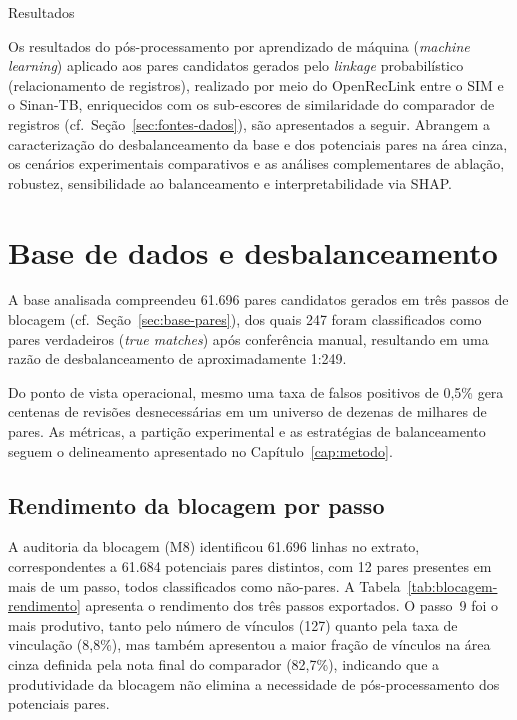 \begin{chapter}{Resultados}
\label{cap:resultados}

Os resultados do pós-processamento por aprendizado de máquina (\textit{machine learning}) aplicado aos pares candidatos gerados pelo \textit{linkage} probabilístico (relacionamento de registros), realizado por meio do OpenRecLink \cite{Camargo2000reclink} entre o SIM e o Sinan-TB, enriquecidos com os sub-escores de similaridade do comparador de registros \cite{Lucena2013algoritmos, Jardim2024comparador} (cf.\ Seção~\ref{sec:fontes-dados}), são apresentados a seguir. Abrangem a caracterização do desbalanceamento da base e dos potenciais pares na área cinza, os cenários experimentais comparativos e as análises complementares de ablação, robustez, sensibilidade ao balanceamento e interpretabilidade via SHAP.

\section{Base de dados e desbalanceamento}
\label{sec:cap5-dados-desbalanceamento}

A base analisada compreendeu 61.696 pares candidatos gerados em três passos de blocagem (cf.\ Seção~\ref{sec:base-pares}), dos quais 247 foram classificados como pares verdadeiros (\textit{true matches}) após conferência manual, resultando em uma razão de desbalanceamento de aproximadamente 1:249.

Do ponto de vista operacional, mesmo uma taxa de falsos positivos de 0,5\% gera centenas de revisões desnecessárias em um universo de dezenas de milhares de pares. As métricas, a partição experimental e as estratégias de balanceamento seguem o delineamento apresentado no Capítulo~\ref{cap:metodo}.

\subsection{Rendimento da blocagem por passo}
\label{sec:blocagem-rendimento}

A auditoria da blocagem (M8) identificou 61.696 linhas no extrato, correspondentes a 61.684 potenciais pares distintos, com 12 pares presentes em mais de um passo, todos classificados como não-pares. A Tabela~\ref{tab:blocagem-rendimento} apresenta o rendimento dos três passos exportados. O passo~9 foi o mais produtivo, tanto pelo número de vínculos (127) quanto pela taxa de vinculação (8,8\%), mas também apresentou a maior fração de vínculos na área cinza definida pela nota final do comparador (82,7\%), indicando que a produtividade da blocagem não elimina a necessidade de pós-processamento dos potenciais pares.


\end{chapter}
